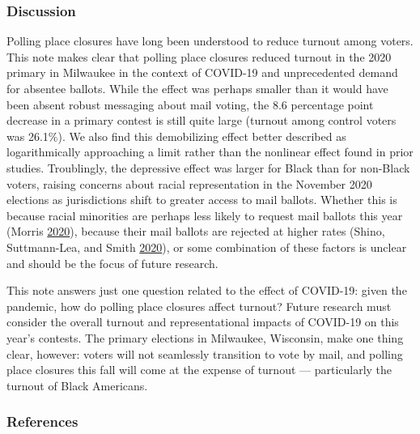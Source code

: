 \documentclass[
  12pt,
]{article}
\begin{document}
\hypertarget{discussion}{%
\subsubsection*{Discussion}\label{discussion}}

Polling place closures have long been understood to reduce turnout among voters. This note makes clear that polling place closures reduced turnout in the 2020 primary in Milwaukee in the context of COVID-19 and unprecedented demand for absentee ballots. While the effect was perhaps smaller than it would have been absent robust messaging about mail voting, the 8.6 percentage point decrease in a primary contest is still quite large (turnout among control voters was 26.1\%). We also find this demobilizing effect better described as logarithmically approaching a limit rather than the nonlinear effect found in prior studies. Troublingly, the depressive effect was larger for Black than for non-Black voters, raising concerns about racial representation in the November 2020 elections as jurisdictions shift to greater access to mail ballots. Whether this is because racial minorities are perhaps less likely to request mail ballots this year (Morris \protect\hyperlink{ref-Morris2020}{2020}), because their mail ballots are rejected at higher rates (Shino, Suttmann-Lea, and Smith \protect\hyperlink{ref-Shino2020}{2020}), or some combination of these factors is unclear and should be the focus of future research.

This note answers just one question related to the effect of COVID-19: given the pandemic, how do polling place closures affect turnout? Future research must consider the overall turnout and representational impacts of COVID-19 on this year's contests. The primary elections in Milwaukee, Wisconsin, make one thing clear, however: voters will not seamlessly transition to vote by mail, and polling place closures this fall will come at the expense of turnout --- particularly the turnout of Black Americans.

\newpage

\hypertarget{references}{%
\subsubsection*{References}\label{references}}
\end{document}
